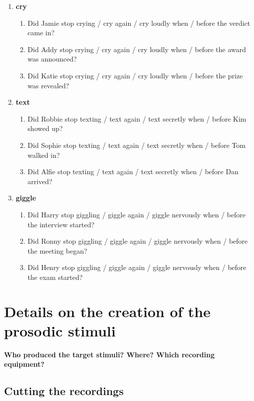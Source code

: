 \documentclass[a4paper,12pt]{article}
\newcommand{\6}{\mbox{$[\hspace*{-.6mm}[$}}
\newcommand{\9}{\mbox{$]\hspace*{-.6mm}]$}}
\begin{document}
\begin{enumerate}[leftmargin=3ex,itemsep=-4pt]
\item {\bf cry}
\begin{enumerate}[leftmargin=2ex,itemsep=-4pt]
\item Did Jamie stop crying	/ cry again	/ cry loudly when /	before the verdict came in?
\item Did Addy stop crying	/ cry again	/ cry loudly when / before the award was announced?
\item Did Katie stop crying	/ cry again	/ cry loudly when / before the prize was revealed?
\end{enumerate}


\item {\bf text} 
\begin{enumerate}[leftmargin=2ex,itemsep=-4pt]
\item Did Robbie stop texting	/ text again	/ text secretly	when / before Kim showed up?
\item Did Sophie stop texting / text again	/ text secretly	when / before Tom walked in?
\item Did Alfie stop texting  / text again	/ text secretly	when / before Dan arrived?
\end{enumerate}


\item {\bf giggle}
\begin{enumerate}[leftmargin=2ex,itemsep=-4pt]
\item Did Harry stop giggling / giggle again / giggle nervously	when / before the interview started?
\item Did Ronny stop giggling	/ giggle again	/ giggle nervously	when / before the meeting began?
\item Did Henry stop giggling / giggle again / giggle nervously	when / before the exam started?

\end{enumerate}
\end{enumerate}

\section{Details on the creation of the prosodic stimuli}\label{a-splicing}

{\bf Who produced the target stimuli? Where? Which recording equipment?}

\subsection{Cutting the recordings}
\end{document}
